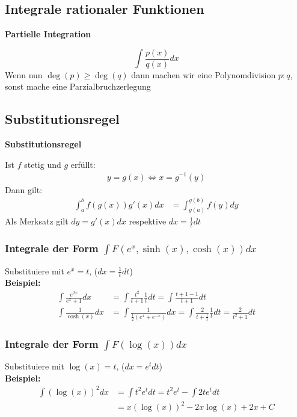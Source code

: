\documentclass[25pt]{sciposter}
\newenvironment{method}[1]{\begin{mdframed}[backgroundcolor=blue!10,innertopmargin=15pt, innerbottommargin=15pt, nobreak=true]
		\textbf{#1 }
	}
	{ 
	\end{mdframed}
}
\begin{document}
\begin{multicols}{3}
\subsection*{Integrale rationaler Funktionen}
\begin{method}{Partielle Integration}
	$$\int \frac{p(x)}{q(x)} dx$$
	Wenn nun $\deg(p) \geq \deg(q)$ dann machen wir eine Polynomdivision $p:q$, sonst mache eine Parzialbruchzerlegung
\end{method}

\subsection*{Substitutionsregel}
\begin{method}{Substitutionsregel}
Ist $f$ stetig und $g$ erfüllt:
\begin{align*}
	y = g(x) \iff x = g^{-1}(y)
\end{align*}
Dann gilt:
\begin{align*}
\int_a ^b f(g(x))g'(x) dx &= \int_{g(a)}^{g(b)} f(y) dy
\end{align*}
Als Merksatz gilt $dy = g'(x) dx$ respektive $dx = \frac{1}{t} dt$
\end{method}

\subsubsection*{Integrale der Form $\int F(e^x, \sinh(x), \cosh(x)) dx$}
Substituiere mit $e^x = t$, ($dx = \frac{1}{t} dt$)\\
\textbf{Beispiel:}
\begin{align*}
	\int \frac{e^{2x}}{e^x + 1} dx &= \int \frac{t^2}{t + 1 } \frac{1}{t} dt = \int\frac{t +1 - 1}{t+1} dt\\
	\int \frac{1}{\cosh(x)} dx &= \int \frac{1}{\frac{1}{2} (e^x + e^{-x})} dx = \int \frac{2}{t + \frac{1}{t}} \frac{1}{t} dt = \frac{2}{t^2 + 1} dt
\end{align*}

\subsubsection*{Integrale der Form $\int F(\log(x)) dx$}
Substituiere mit $\log(x) = t$, ($dx = e^t dt$)\\
\textbf{Beispiel:}
\begin{align*}
	\int (\log(x))^2 dx &= \int t^2 e^t dt = t^2 e^t - \int 2t e^t dt  \\
	&= x(\log(x))^2 -2x\log(x) + 2x + C
\end{align*}


\end{multicols}
\end{document}

